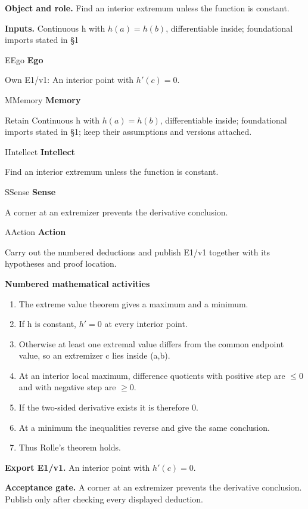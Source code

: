 \documentclass[preprint,12pt,aps,pra,showkeys,amsmath,amssymb,superscriptaddress,floatfix]{revtex4-2}
\theoremstyle{definition}
\theoremstyle{remark}
\newcommand{\mmfaculty}[3]{%
 \begin{mmfacultybox}{#1}{#2}
 {\sffamily\bfseries\color{MMBlue}#2}\par\smallskip #3
 \end{mmfacultybox}}
\newcommand{\field}[2]{\par\smallskip\noindent\textbf{#1.} #2\par}
\begin{document}
\field{Object and role}{Find an interior extremum unless the function is constant.}

\field{Inputs}{Continuous h with \(h(a)=h(b)\), differentiable inside; foundational
imports stated in §1}

\mmfaculty{E}{Ego}{Own E1/v1: An interior point with \(h'(c)=0\).}

\mmfaculty{M}{Memory}{Retain Continuous h with \(h(a)=h(b)\), differentiable inside;
foundational imports stated in §1; keep their assumptions and versions
attached.}

\mmfaculty{I}{Intellect}{Find an interior extremum unless the function is constant.}

\mmfaculty{S}{Sense}{A corner at an extremizer prevents the derivative conclusion.}

\mmfaculty{A}{Action}{Carry out the numbered deductions and publish E1/v1 together with its
hypotheses and proof location.}

\smallskip\noindent\textbf{Numbered mathematical activities}

\begin{enumerate}[label=N1.\arabic*,leftmargin=3.4em]

\item The extreme value theorem gives a maximum and a minimum.

\item If h is constant, \(h'=0\) at every interior point.

\item Otherwise at least one extremal value differs from the common endpoint
value, so an extremizer c lies inside (a,b).

\item At an interior local maximum, difference quotients with positive step
are \(\le 0\) and with negative step are \(\ge 0\).

\item If the two-sided derivative exists it is therefore 0.

\item At a minimum the inequalities reverse and give the same conclusion.

\item Thus Rolle's theorem holds.

\end{enumerate}

\field{Export E1/v1}{An interior point with \(h'(c)=0\).}

\field{Acceptance gate}{A corner at an extremizer prevents the derivative conclusion. Publish
only after checking every displayed deduction.}
\end{document}
